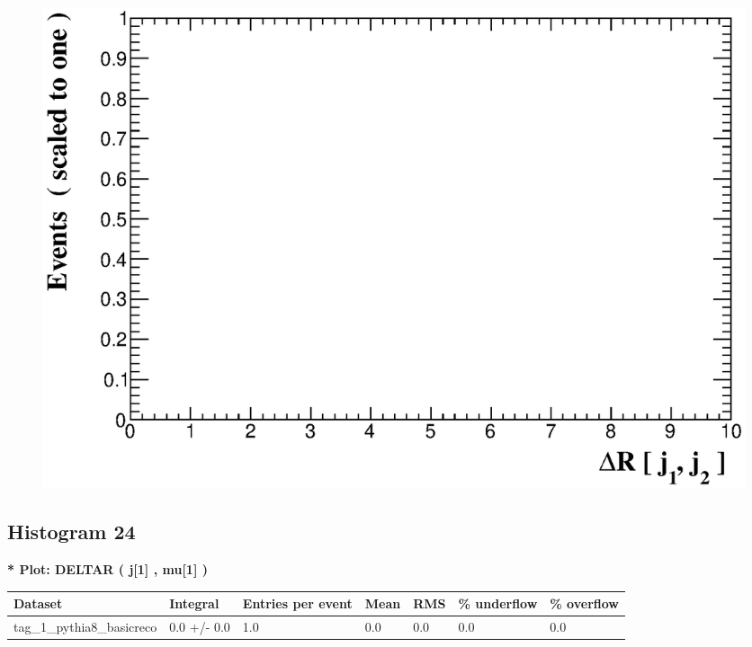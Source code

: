 \documentclass[a4paper, 10pt]{article}
\begin{document}
\begin{figure}[H]
  \begin{center}
    \includegraphics[scale=0.45]{selection_22.eps}\\
\caption{   }
  \end{center}
\end{figure}
      \newpage
\subsection{ Histogram 24}

\textbf{* Plot: DELTAR ( j[1] , mu[1] ) }\\
   \begin{table}[H]
  \begin{center}
    \begin{tabular}{|m{23.0mm}|m{23.0mm}|m{18.0mm}|m{19.0mm}|m{19.0mm}|m{19.0mm}|m{19.0mm}|}
      \hline
      {\cellcolor{yellow}         Dataset}& {\cellcolor{yellow}         Integral}& {\cellcolor{yellow}         Entries per event}& {\cellcolor{yellow}         Mean}& {\cellcolor{yellow}         RMS}& {\cellcolor{yellow}         \% underflow}& {\cellcolor{yellow}         \% overflow}\\
      \hline
      {\cellcolor{white}         tag\_1\_pythia8\_basicreco}& {\cellcolor{white}         0.0 +/\-- 0.0}& {\cellcolor{white}         1.0}& {\cellcolor{white}         0.0}& {\cellcolor{white}         0.0}& {\cellcolor{green}         0.0}& {\cellcolor{green}         0.0}\\
\hline
    \end{tabular}
  \end{center}
\end{table}
\end{document}

